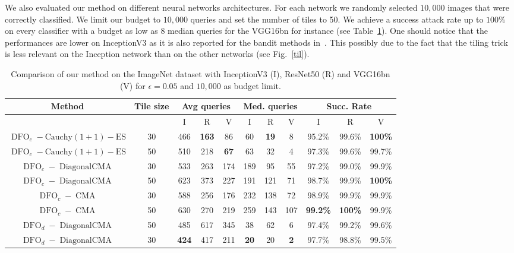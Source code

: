 \begin{subappendices}
We also evaluated our method on different  neural networks architectures. For each network we randomly selected $10,000$ images that were correctly classified. We limit our budget to $10,000$ queries and set the number of tiles to 50. 
We achieve a success attack rate up to $100\%$ on every classifier with a budget as low as 8 median queries for the VGG16bn for instance (see Table~\ref{untargeted_archi}). One should notice  that the performances are lower on InceptionV3 as it is also reported for the bandit methods in~\citep{ilyas2018prior}. This possibly due to the fact that the tiling trick is less relevant on the Inception network than on the other networks (see Fig.~\ref{til}).




\begin{table}[htb]
\caption{Comparison of our method on the ImageNet dataset with InceptionV3 (I), ResNet50 (R) and VGG16bn (V) for $\epsilon=0.05$ and $10,000$ as budget limit.}
\label{untargeted_archi}
\begin{center}
\begin{tabular}{cc|ccc|ccc|ccc}
\textbf{Method} &\textbf{Tile size}&\multicolumn{3}{c|}{\textbf{Avg queries}}&\multicolumn{3}{c|}{\textbf{Med. queries}}&\multicolumn{3}{c}{\textbf{Succ. Rate}}\\
\hline
 & & I & R & V &  I & R & V&  I & R & V\\
 \hline
$\operatorname{DFO}_c-\operatorname{Cauchy (1+1)-ES }$ &30 & 466&\textbf{163}&86 & 60&\textbf{19}&8 & 95.2\%&99.6\%&\textbf{100\% }\\

$\operatorname{DFO}_c-\operatorname{Cauchy (1+1)-ES }$ & 50 & 510&218&\textbf{67}& 63&32&4& 97.3\% &99.6\%&99.7\%\\
\hline
$\operatorname{DFO}_c-\operatorname{DiagonalCMA}$& 30 &533&263&174& 189&95&55 & 97.2\%&99.0\%&99.9\%\\
$\operatorname{DFO}_c-\operatorname{DiagonalCMA}$ & 50 & 623&373&227& 191&121&71 & 98.7\%&99.9\%&\textbf{100\%}\\

\hline
$\operatorname{DFO}_c-\operatorname{CMA}$& 30 &588&256&176& 232&138&72& 98.9\%&99.9\%&99.9\%\\
$\operatorname{DFO}_c-\operatorname{CMA}$ & 50 & 630&270&219& 259&143&107 & \textbf{99.2\%}&\textbf{100\%}&99.9\%\\

\hline
$\operatorname{DFO}_d-\operatorname{DiagonalCMA}$& 50 & 485&617&345& 38& 62&6& 97.4\%&99.2\%&99.6\%\\
$\operatorname{DFO}_d-\operatorname{DiagonalCMA}$ & 30 & \textbf{424}&417&211& \textbf{20}&20&\textbf{2}& 97.7\%&98.8\%&99.5\%\\
\end{tabular}
\end{center}
\end{table}



\end{subappendices}

